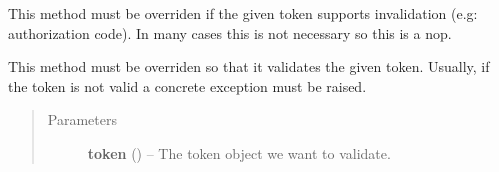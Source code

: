 \documentclass[letterpaper,10pt,english]{sphinxmanual}
\begin{document}
\begin{fulllineitems}
\begin{fulllineitems}
\label{features/oauth2/technical_summary:fantastico.oauth2.token_generator.TokenGenerator.invalidate}
This method must be overriden if the given token supports invalidation (e.g: authorization code). In many cases
this is not necessary so this is a nop.

\end{fulllineitems}


\begin{fulllineitems}
\label{features/oauth2/technical_summary:fantastico.oauth2.token_generator.TokenGenerator.validate}
This method must be overriden so that it validates the given token. Usually, if the token is not valid a concrete
exception must be raised.
\begin{quote}\begin{description}
\item[{Parameters}] \leavevmode
\textbf{token} ({\hyperref[features/oauth2/technical_summary:fantastico.oauth2.token.Token]{}}) -- The token object we want to validate.

\end{description}\end{quote}

\end{fulllineitems}


\end{fulllineitems}

\end{document}
